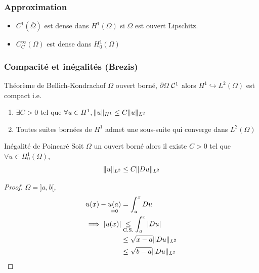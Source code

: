 \documentclass[]{report}
\begin{document}
    \subsubsection*{Approximation}

    \begin{tm}{}{}
        \begin{itemize}
            \item $C^1(\overline{\Omega})$ est dense dans $H^1(\Omega)$ si $\Omega$ est ouvert Lipschitz.
            \item $C_C^\infty(\Omega)$ est dense dans $H_0^1(\Omega)$
        \end{itemize}
    \end{tm}

    \subsubsection*{Compacité et inégalités (Brezis)}

    \begin{tm}{Théorème de Bellich-Kondrachof}{}
        $\Omega$ ouvert borné, $\partial \Omega$ $\mathcal{C}^1$ alors $H^1\hookrightarrow L^2(\Omega)$ est compact i.e.
        \begin{enumerate}
            \item $\exists C>0$ tel que $\forall u\in H^1,\lVert u \rVert_{H^1}\le C\lVert u \rVert_{L^2}$
            \item Toutes suites bornées de $H^1$ admet une sous-suite qui converge dans $L^2(\Omega)$
        \end{enumerate}
    \end{tm}

    \begin{prop}{Inégalité de Poincaré}{}
        Soit $\Omega$ un ouvert borné alors il existe $C>0$ tel que $\forall u \in H_0^1(\Omega)$,
        \[\lVert u \rVert_{L^2}\le C\lVert Du \rVert_{L^2}\]
    \end{prop}

    \begin{proof}
        $\Omega=]a,b[$,
        \begin{align*}
            u(x)-\underset{=0}{u(a)}&=\int_a^x Du\\
            \implies |u(x)|&\underset{\text{C.S.}}{\le} \int _a^x|Du|\\
            &\le \sqrt{x-a}\lVert Du \rVert_{L^2}\\
            &\le \sqrt{b-a}\lVert Du \rVert_{L^2}
        \end{align*}
    \end{proof}
\end{document}
